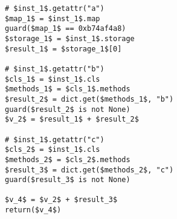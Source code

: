 \begin{Verbatim}
# $inst_1$.getattr("a")
$map_1$ = $inst_1$.map
guard($map_1$ == 0xb74af4a8)
$storage_1$ = $inst_1$.storage
$result_1$ = $storage_1$[0]

# $inst_1$.getattr("b")
$cls_1$ = $inst_1$.cls
$methods_1$ = $cls_1$.methods
$result_2$ = dict.get($methods_1$, "b")
guard($result_2$ is not None)
$v_2$ = $result_1$ + $result_2$

# $inst_1$.getattr("c")
$cls_2$ = $inst_1$.cls
$methods_2$ = $cls_2$.methods
$result_3$ = dict.get($methods_2$, "c")
guard($result_3$ is not None)

$v_4$ = $v_2$ + $result_3$
return($v_4$)
\end{Verbatim}
